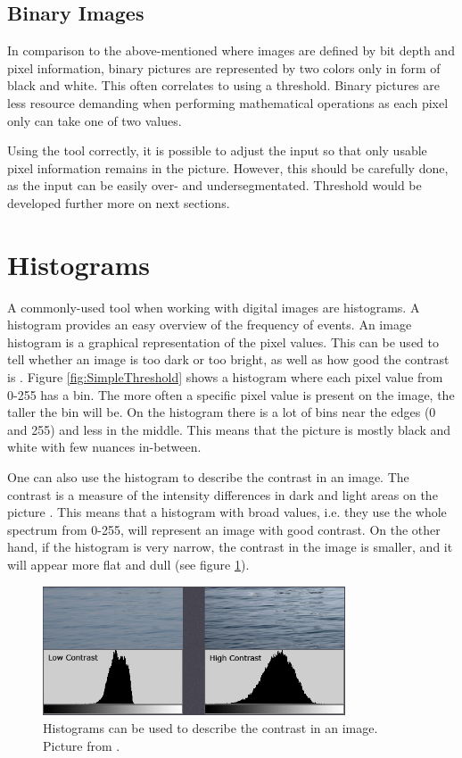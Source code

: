 \subsection{Binary Images}
In comparison to the above-mentioned where images are defined by bit depth and pixel information, binary pictures are represented by two colors only in form of black and white. This often correlates to using a threshold. Binary pictures are less resource demanding when performing mathematical operations as each pixel only can take one of two values.

Using the tool correctly, it is possible to adjust the input so that only usable pixel information remains in the picture. However, this should be carefully done, as the input can be easily over- and undersegmentated. Threshold would be developed further more on next sections.

\section{Histograms}
A commonly-used tool when working with digital images are histograms. A histogram provides an easy overview of the frequency of events. An image histogram is a graphical representation of the pixel values. This can be used to tell whether an image is too dark or too bright, as well as how good the contrast is \citep{ip_book}. Figure \ref{fig:SimpleThreshold} shows a histogram where each pixel value from 0-255 has a bin. The more often a specific pixel value is present on the image, the taller the bin will be. On the histogram there is a lot of bins near the edges (0 and 255) and less in the middle. This means that the picture is mostly black and white with few nuances in-between.

One can also use the histogram to describe the contrast in an image. The contrast is a measure of the intensity differences in dark and light areas on the picture \citep{histogram}. This means that a histogram with broad values, i.e. they use the whole spectrum from 0-255, will represent an image with good contrast. On the other hand, if the histogram is very narrow, the contrast in the image is smaller, and it will appear more flat and dull (see figure \ref{fig:histogram_contrast}).

\begin{figure}[htbp]
\centering
\includegraphics[width=0.80\textwidth]{Pictures/Theory/hisogram_contrast.png}
\caption{Histograms can be used to describe the contrast in an image. Picture from \citep{histogram}.}
\label{fig:histogram_contrast}
\end{figure}

